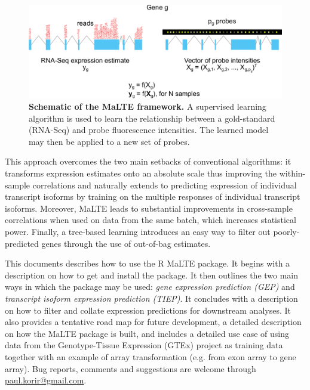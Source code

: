 \documentclass[a4paper,12pt]{article}
\begin{document}
\begin{figure}[H]
\centering
\includegraphics[width=\columnwidth]{schematic.pdf}
\caption{\textbf{Schematic of the MaLTE framework.} A supervised learning algorithm is used to learn the relationship between a gold-standard (RNA-Seq) and probe fluorescence intensities. The learned model may then be applied to a new set of probes.}
\label{fig:schematic}
\end{figure}

This approach overcomes the two main setbacks of conventional algorithms: it transforms expression estimates onto an absolute scale thus improving the within-sample correlations and naturally extends to predicting expression of individual transcript isoforms by training on the multiple responses of individual transcript isoforms. Moreover, \textsf{MaLTE} leads to substantial improvements in cross-sample correlations when used on data from the same batch, which increases statistical power. Finally, a tree-based learning introduces an easy way to filter out poorly-predicted genes through the use of out-of-bag estimates.

This documents describes how to use the \textsf{R} \textsf{MaLTE} package. It begins with a description on how to get and install the package. It then outlines the two main ways in which the package may be used: \textit{gene expression prediction (GEP)} and \textit{transcript isoform expression prediction (TIEP)}. It concludes with a description on how to filter and collate expression predictions for downstream analyses. It also provides a tentative road map for future development, a detailed description on how the \textsf{MaLTE} package is built, and includes a detailed use case of using data from the Genotype-Tissue Expression (GTEx) project \cite{lonsdale2013genotype} as training data together with an example of array transformation (e.g. from exon array to gene array). Bug reports, comments and suggestions are welcome through \href{mailto:paul.korir@gmail.com}{paul.korir@gmail.com}.
\end{document}
